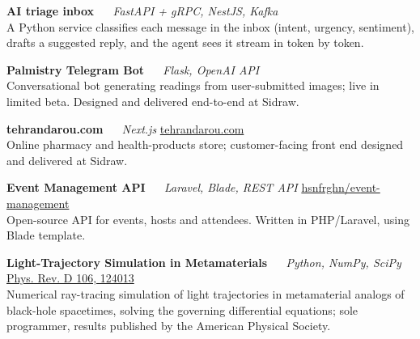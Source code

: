 \vspace{0.65em}

\projecticon\textbf{AI triage inbox} ~\softtext{\textbullet}~ {\small \textit{FastAPI + gRPC, NestJS, Kafka}}  \\
{\small A Python service classifies each message in the inbox (intent, urgency, sentiment), drafts a suggested reply, and the agent sees it stream in token by token.}

\vspace{0.65em}

\projecticon\textbf{Palmistry Telegram Bot} ~\softtext{\textbullet}~ {\small \textit{Flask, OpenAI API}} \\
{\small Conversational bot generating readings from user-submitted images; live in limited beta. Designed and delivered end-to-end at Sidraw.}

\vspace{0.65em}

\projecticon\textbf{tehrandarou.com} ~\softtext{\textbullet}~ {\small \textit{Next.js}} \hfill {\small \href{https://tehrandarou.com}{tehrandarou.com}} \\
{\small Online pharmacy and health-products store; customer-facing front end designed and delivered at Sidraw.}

\vspace{0.65em}

\projecticon\textbf{Event Management API} ~\softtext{\textbullet}~ {\small \textit{Laravel, Blade, REST API}} \hfill {\small \href{https://github.com/hsnfrghn/event-management}{hsnfrghn/event-management}} \\
{\small Open-source API for events, hosts and attendees. Written in PHP/Laravel, using Blade template.}

\vspace{0.65em}

\projecticon\textbf{Light-Trajectory Simulation in Metamaterials} ~\softtext{\textbullet}~ {\small \textit{Python, NumPy, SciPy}} \hfill {\small \href{https://link.aps.org/doi/10.1103/PhysRevD.106.124013}{Phys. Rev. D 106, 124013}} \\
{\small Numerical ray-tracing simulation of light trajectories in metamaterial analogs of black-hole spacetimes, solving the governing differential equations; sole programmer, results published by the American Physical Society.}

